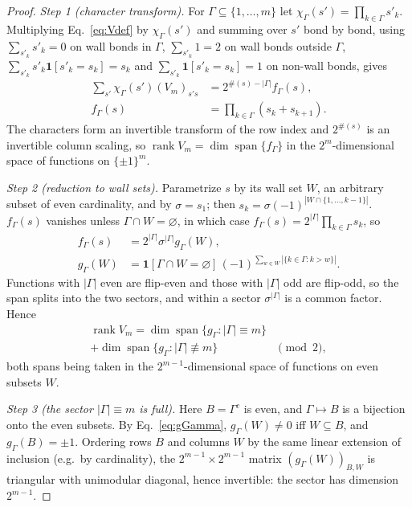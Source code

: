\documentclass[aps,prx,reprint,superscriptaddress,nobibnotes,longbibliography]{revtex4-2}
\theoremstyle{remark}
\newcommand{\rk}{\operatorname{rank}}
\newcommand{\Iv}[1]{\mathbf 1[#1]}
\begin{document}
\begin{proof}
\emph{Step 1 (character transform).}  For $\Gamma\subseteq\{1,\ldots,m\}$ let $\chi_\Gamma(s')=\prod_{k\in\Gamma}s'_k$.  Multiplying Eq.~\eqref{eq:Vdef} by $\chi_\Gamma(s')$ and summing over $s'$ bond by bond, using $\sum_{s'_k}s'_k=0$ on wall bonds in $\Gamma$, $\sum_{s'_k}1=2$ on wall bonds outside $\Gamma$, $\sum_{s'_k}s'_k\Iv{s'_k=s_k}=s_k$ and $\sum_{s'_k}\Iv{s'_k=s_k}=1$ on non-wall bonds, gives
\begin{align}
 \sum_{s'}\chi_\Gamma(s')(V_m)_{s's}&=2^{\#(s)-|\Gamma|}f_\Gamma(s),\nonumber\\
 f_\Gamma(s)&=\prod_{k\in\Gamma}(s_k+s_{k+1}).
 \label{eq:chartransform}
\end{align}
The characters form an invertible transform of the row index and $2^{\#(s)}$ is an invertible column scaling, so $\rk V_m=\dim\operatorname{span}\{f_\Gamma\}$ in the $2^m$-dimensional space of functions on $\{\pm1\}^m$.

\emph{Step 2 (reduction to wall sets).}  Parametrize $s$ by its wall set $W$, an arbitrary subset of even cardinality, and by $\sigma=s_1$; then $s_k=\sigma(-1)^{|W\cap\{1,\ldots,k-1\}|}$.  $f_\Gamma(s)$ vanishes unless $\Gamma\cap W=\varnothing$, in which case $f_\Gamma(s)=2^{|\Gamma|}\prod_{k\in\Gamma}s_k$, so
\begin{align}
 f_\Gamma(s)&=2^{|\Gamma|}\sigma^{|\Gamma|}g_\Gamma(W),\nonumber\\
 g_\Gamma(W)&=\Iv{\Gamma\cap W=\varnothing}\,(-1)^{\sum_{w\in W}|\{k\in\Gamma:k>w\}|}.
 \label{eq:gGamma}
\end{align}
Functions with $|\Gamma|$ even are flip-even and those with $|\Gamma|$ odd are flip-odd, so the span splits into the two sectors, and within a sector $\sigma^{|\Gamma|}$ is a common factor.  Hence
\begin{align}
 \rk V_m=\dim\operatorname{span}\{g_\Gamma:|\Gamma|\equiv m\}&\nonumber\\
 +\dim\operatorname{span}\{g_\Gamma:|\Gamma|\not\equiv m\}&\pmod 2,
 \label{eq:sectorsum}
\end{align}
both spans being taken in the $2^{m-1}$-dimensional space of functions on even subsets $W$.

\emph{Step 3 (the sector $|\Gamma|\equiv m$ is full).}  Here $B=\Gamma^c$ is even, and $\Gamma\mapsto B$ is a bijection onto the even subsets.  By Eq.~\eqref{eq:gGamma}, $g_\Gamma(W)\ne0$ iff $W\subseteq B$, and $g_\Gamma(B)=\pm1$.  Ordering rows $B$ and columns $W$ by the same linear extension of inclusion (e.g.\ by cardinality), the $2^{m-1}\times2^{m-1}$ matrix $(g_\Gamma(W))_{B,W}$ is triangular with unimodular diagonal, hence invertible: the sector has dimension $2^{m-1}$.


\end{proof}
\end{document}
